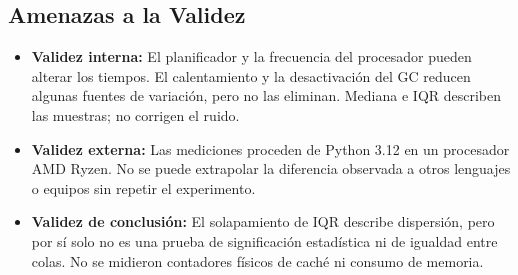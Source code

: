 \subsection{Amenazas a la Validez}
\begin{itemize}
    \item \textbf{Validez interna:} El planificador y la frecuencia del procesador pueden alterar los tiempos. El calentamiento y la desactivación del GC reducen algunas fuentes de variación, pero no las eliminan. Mediana e IQR describen las muestras; no corrigen el ruido.
    \item \textbf{Validez externa:} Las mediciones proceden de Python 3.12 en un procesador AMD Ryzen. No se puede extrapolar la diferencia observada a otros lenguajes o equipos sin repetir el experimento.
    \item \textbf{Validez de conclusión:} El solapamiento de IQR describe dispersión, pero por sí solo no es una prueba de significación estadística ni de igualdad entre colas. No se midieron contadores físicos de caché ni consumo de memoria.
\end{itemize}
